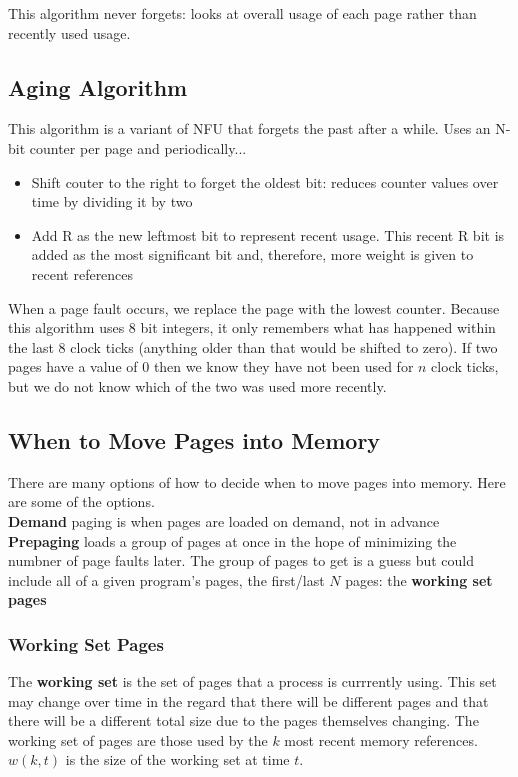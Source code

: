 \documentclass{article}
\newcommand{\bold}[1]{\textbf{#1}}
\renewcommand{\b}{\item[$\circ$]}
\newcommand{\newlist}{\begin{itemize}}
\renewcommand{\endlist}{\end{itemize}}
\begin{document}
This algorithm never forgets: looks at overall usage of each page rather than recently used usage. 

\subsection{Aging Algorithm}

This algorithm is a variant of NFU that forgets the past after a while. Uses an N-bit counter per page and periodically...

\newlist 
\b Shift couter to the right to forget the oldest bit: reduces counter values over time by dividing it by two
\b Add R as the new leftmost bit to represent recent usage. This recent R bit is added as the most significant bit and, therefore, more weight is given to recent references
\endlist 

When a page fault occurs, we replace the page with the lowest counter. Because this algorithm uses 8 bit integers, it only remembers what has happened within the last 8 clock ticks (anything older than that would be shifted to zero). If two pages have a value of 0 then we know they have not been used for $n$ clock ticks, but we do not know which of the two was used more recently. 

\subsection{When to Move Pages into Memory}

There are many options of how to decide when to move pages into memory. Here are some of the options. \\ 

\bold{Demand} paging is when pages are loaded on demand, not in advance \\ 

\bold{Prepaging} loads a group of pages at once in the hope of minimizing the numbner of page faults later. The group of pages to get is a guess but could include all of a given program's pages, the first/last $N$ pages: the \bold{working set pages} \\ 

\subsubsection{Working Set Pages}

The \bold{working set} is the set of pages that a process is currrently using. This set may change over time in the regard that there will be different pages and that there will be a different total size due to the pages themselves changing. The working set of pages are those used by the $k$ most recent memory references. $w(k,t)$ is the size of the working set at time $t$. \\ 
\end{document}
